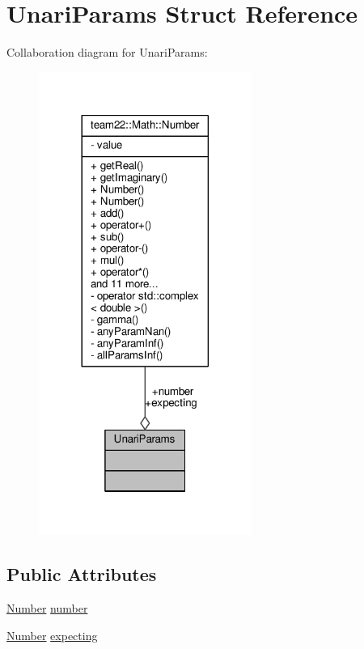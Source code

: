 \hypertarget{struct_unari_params}{}\section{Unari\+Params Struct Reference}
\label{struct_unari_params}


Collaboration diagram for Unari\+Params\+:
\nopagebreak
\begin{figure}[H]
\begin{center}
\leavevmode
\includegraphics[width=197pt]{struct_unari_params__coll__graph}
\end{center}
\end{figure}
\subsection*{Public Attributes}
\begin{DoxyCompactItemize}
\item 
\hyperlink{classteam22_1_1_math_1_1_number}{Number} \hyperlink{struct_unari_params_a85762f9bb00163170524b43c7947dca1}{number}
\item 
\hyperlink{classteam22_1_1_math_1_1_number}{Number} \hyperlink{struct_unari_params_a4ea568291d8eb7ad9431e8457787d25f}{expecting}
\end{DoxyCompactItemize}
